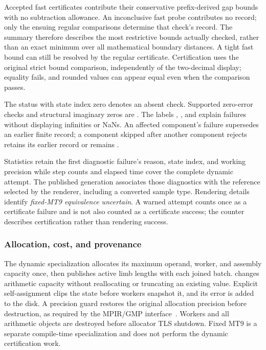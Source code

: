 Accepted fast certificates contribute their conservative prefix-derived gap
bounds with no subtraction allowance. An inconclusive fast probe contributes
no record; only the ensuing regular comparisons determine that check's
record. The summary therefore describes the most restrictive bounds actually
checked, rather than an exact minimum over all mathematical boundary distances.
A tight fast bound can still be resolved by the regular certificate.
Certification uses the original strict bound comparison, independently of the
two-decimal display; equality fails, and rounded values can appear equal even
when the comparison passes.

The status  with state index zero denotes an absent check.
Supported zero-error checks and structural imaginary zeros are .
The labels , , and
 explain failures without displaying infinities or NaNs.
An affected component's failure supersedes an earlier finite record; a
component skipped after another component rejects retains its earlier record
or remains .

Statistics retain the first diagnostic failure's reason, state index, and working
precision while step counts and elapsed time cover the complete dynamic attempt.
The published generation associates those diagnostics with the reference selected
by the renderer, including a converted sample type. Rendering details identify
\emph{fixed-MT9 equivalence uncertain}. A warned attempt counts once as a certificate
failure and is not also counted as a certificate success; the counter describes
certification rather than rendering success.

\subsubsection{Allocation, cost, and provenance}

The dynamic specialization allocates its maximum operand, worker, and assembly
capacity once, then publishes active limb lengths with each joined batch.
 changes arithmetic capacity without reallocating or
truncating an existing value. Explicit self-assignment clips the state before
workers snapshot it, and its error is added to the disk. A precision guard
restores the original allocation precision before destruction, as required
by the MPIR/GMP interface~\cite{GMPFloatManual}. Workers and all arithmetic
objects are destroyed before allocator TLS shutdown. Fixed MT9 is a separate
compile-time specialization and does not perform the dynamic certification work.

